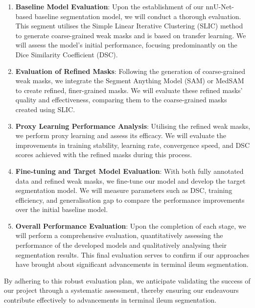 \begin{enumerate}
    \item \textbf{Baseline Model Evaluation}: Upon the establishment of our nnU-Net-based baseline segmentation model, we will conduct a thorough evaluation. This segment utilises the Simple Linear Iterative Clustering (SLIC) method to generate coarse-grained weak masks and is based on transfer learning. We will assess the model's initial performance, focusing predominantly on the Dice Similarity Coefficient (DSC).
    \item \textbf{Evaluation of Refined Masks}: Following the generation of coarse-grained weak masks, we integrate the Segment Anything Model (SAM) or MedSAM to create refined, finer-grained masks. We will evaluate these refined masks' quality and effectiveness, comparing them to the coarse-grained masks created using SLIC.
    \item \textbf{Proxy Learning Performance Analysis}: Utilising the refined weak masks, we perform proxy learning and assess its efficacy. We will evaluate the improvements in training stability, learning rate, convergence speed, and DSC scores achieved with the refined masks during this process.
    \item \textbf{Fine-tuning and Target Model Evaluation}: With both fully annotated data and refined weak masks, we fine-tune our model and develop the target segmentation model. We will measure parameters such as DSC, training efficiency, and generalisation gap to compare the performance improvements over the initial baseline model.
    \item \textbf{Overall Performance Evaluation}: Upon the completion of each stage, we will perform a comprehensive evaluation, quantitatively assessing the performance of the developed models and qualitatively analysing their segmentation results. This final evaluation serves to confirm if our approaches have brought about significant advancements in terminal ileum segmentation.
\end{enumerate}
By adhering to this robust evaluation plan, we anticipate validating the success of our project through a systematic assessment, thereby ensuring our endeavours contribute effectively to advancements in terminal ileum segmentation.